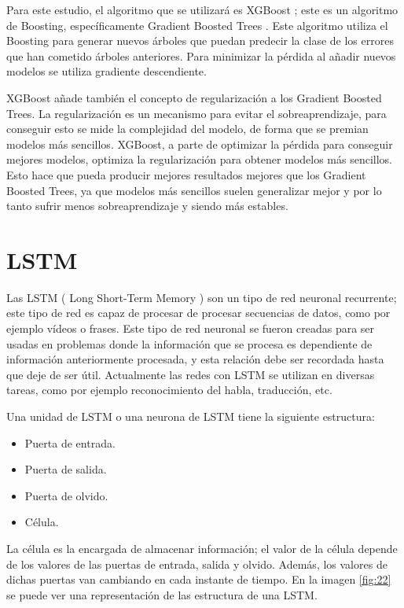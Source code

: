 Para este estudio, el algoritmo que se utilizará es XGBoost \cite{chen2016xgboost}; este es un algoritmo de Boosting, específicamente Gradient Boosted Trees \cite{friedman2002stochastic}. Este algoritmo utiliza el Boosting para generar nuevos árboles que puedan predecir la clase de los errores que han cometido árboles anteriores. Para minimizar la pérdida al añadir nuevos modelos se utiliza gradiente descendiente.\newline

XGBoost añade también el concepto de regularización a los Gradient Boosted Trees. La regularización es un mecanismo para evitar el sobreaprendizaje, para conseguir esto se mide la complejidad del modelo, de forma que se premian modelos más sencillos. XGBoost, a parte de optimizar la pérdida para conseguir mejores modelos, optimiza la regularización para obtener modelos más sencillos. Esto hace que pueda producir mejores resultados mejores que los Gradient Boosted Trees, ya que modelos más sencillos suelen generalizar mejor y por lo tanto sufrir menos sobreaprendizaje y siendo más estables.

\newpage
\section{LSTM}
Las LSTM ( Long Short-Term Memory ) \cite{hochreiter1997long} son un tipo de red neuronal recurrente; este tipo de red es capaz de procesar de procesar secuencias de datos, como por ejemplo vídeos o frases. Este tipo de red neuronal se fueron creadas para ser usadas en problemas donde la información que se procesa es dependiente de información anteriormente procesada, y esta relación debe ser recordada hasta que deje de ser útil. Actualmente las redes con LSTM se utilizan en diversas tareas, como por ejemplo reconocimiento del habla, traducción, etc.\newline

Una unidad de LSTM o una neurona de LSTM tiene la siguiente estructura:
\begin{itemize}
	\item Puerta de entrada.
	\item Puerta de salida.
	\item Puerta de olvido.
	\item Célula.
\end{itemize}
\vspace{0.09in}
La célula es la encargada de almacenar información; el valor de la célula depende de los valores de las puertas de entrada, salida y olvido. Además, los valores de dichas puertas van cambiando en cada instante de tiempo. En la imagen \ref{fig:22} se puede ver una representación de las estructura de una LSTM.\newline

